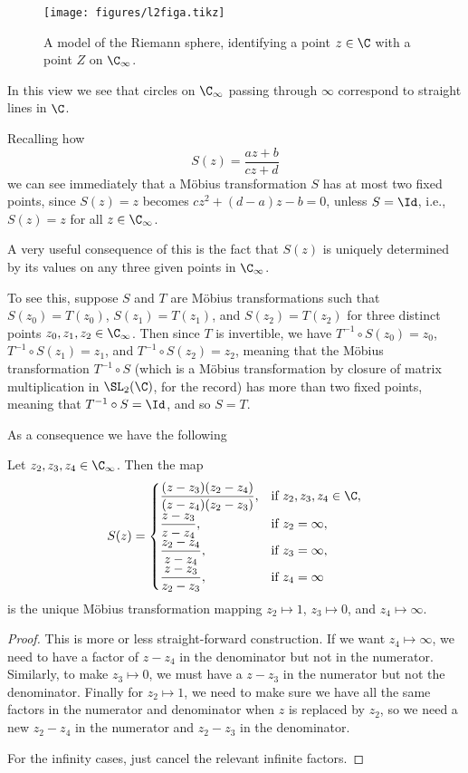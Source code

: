 \begin{figure}
	\centering
	\texttt{[image: figures/l2figa.tikz]}

	\caption{\label{l2:figa} A model of the Riemann sphere, identifying a point $z \in \C$ with a point $Z$ on $\C_\infty$.}
\end{figure}

In this view we see that circles on $\C_\infty$ passing through $\infty$ correspond to straight lines in $\C$.

Recalling how
\[
	S(z) = \frac{a z + b}{c z + d}
\]
we can see immediately that a Möbius transformation $S$ has at most two fixed points, since $S(z) = z$ becomes $c z^2 + (d - a) z - b = 0$, unless $S = \Id$, i.e., $S(z) = z$ for all $z \in \C_\infty$.

A very useful consequence of this is the fact that $S(z)$ is uniquely determined by its values on any three given points in $\C_\infty$.

To see this, suppose $S$ and $T$ are Möbius transformations such that $S(z_0) = T(z_0)$, $S(z_1) = T(z_1)$, and $S(z_2) = T(z_2)$ for three distinct points $z_0, z_1, z_2 \in \C_\infty$.
Then since $T$ is invertible, we have $T^{-1} \circ S (z_0) = z_0$, $T^{-1} \circ S (z_1) = z_1$, and $T^{-1} \circ S (z_2) = z_2$, meaning that the Möbius transformation $T^{-1} \circ S$ (which is a Möbius transformation by closure of matrix multiplication in $\SL_2(\C)$, for the record) has more than two fixed points, meaning that $T^{-1} \circ S = \Id$, and so $S = T$.

As a consequence we have the following
\begin{lemma}\label{lem2.3}
	Let $z_2, z_3, z_4 \in \C_\infty$.
	Then the map
	\[
		S(z) = \begin{cases}
			\displaystyle \frac{(z - z_3) (z_2 - z_4)}{(z - z_4) (z_2 - z_3)}, & \text{if } z_2, z_3, z_4 \in \C, \\
			\displaystyle \frac{z - z_3}{z - z_4}, & \text{if } z_2 = \infty, \\
			\displaystyle \frac{z_2 - z_4}{z - z_4}, & \text{if } z_3 = \infty, \\
			\displaystyle \frac{z - z_3}{z_2 - z_3}, & \text{if } z_4 = \infty
		\end{cases}
	\]
	is the unique Möbius transformation mapping $z_2 \mapsto 1$, $z_3 \mapsto 0$, and $z_4 \mapsto \infty$.
\end{lemma}

\begin{proof}
	This is more or less straight-forward construction.
	If we want $z_4 \mapsto \infty$, we need to have a factor of $z - z_4$ in the denominator but not in the numerator.
	Similarly, to make $z_3 \mapsto 0$, we must have a $z - z_3$ in the numerator but not the denominator.
	Finally for $z_2 \mapsto 1$, we need to make sure we have all the same factors in the numerator and denominator when $z$ is replaced by $z_2$, so we need a new $z_2 - z_4$ in the numerator and $z_2 - z_3$ in the denominator.

	For the infinity cases, just cancel the relevant infinite factors.
\end{proof}

